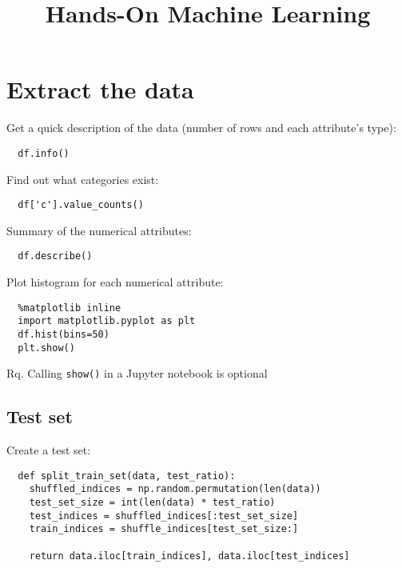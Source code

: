 \documentclass[french]{article}
\title{Hands-On Machine Learning}
\begin{document}
\date{}

\maketitle

\setlength{\parindent}{0cm}

\section{Extract the data}

Get a quick description of the data (number of rows and each attribute's type):
\begin{lstlisting}
  df.info()
\end{lstlisting}

Find out what categories exist:
\begin{lstlisting}
  df['c'].value_counts()
\end{lstlisting}

Summary of the numerical attributes:
\begin{lstlisting}
  df.describe()
\end{lstlisting}

Plot histogram for each numerical attribute:
\begin{lstlisting}
  %matplotlib inline
  import matplotlib.pyplot as plt
  df.hist(bins=50)
  plt.show()
\end{lstlisting}
Rq. Calling \verb|show()| in a Jupyter notebook is optional


\subsection{Test set}

Create a test set:
\begin{lstlisting}
  def split_train_set(data, test_ratio):
    shuffled_indices = np.random.permutation(len(data))
    test_set_size = int(len(data) * test_ratio)
    test_indices = shuffled_indices[:test_set_size]
    train_indices = shuffle_indices[test_set_size:]

    return data.iloc[train_indices], data.iloc[test_indices]
\end{lstlisting}
\end{document}
